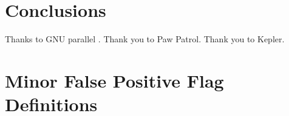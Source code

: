 \documentclass[apj,twocolappendix,numberedappendix]{emulateapj}
\renewcommand{\_}{\discretionary{\underscore}{}{\underscore}}  %
\begin{document}
\section{Conclusions}

\acknowledgments
Thanks to GNU parallel \citep{Tange2011a}.
Thank you to Paw Patrol.
Thank you to Kepler.





%



\clearpage
\appendix
\section{Minor False Positive Flag Definitions}



\clearpage
\tableofcontents
\end{document}
